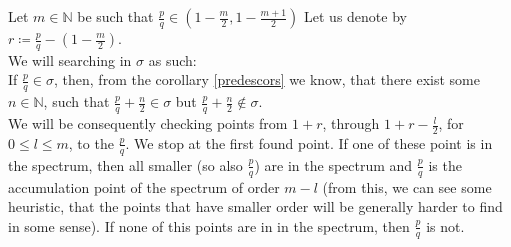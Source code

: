 
Let $m \in \mathbb{N}$ be such that $\frac{p}{q} \in (1-\frac{m}{2},1-
\frac{m+1}{2})$
Let us denote by $r \coloneqq \frac{p}{q} - (1-\frac{m}{2})$. \\ 

We will searching in $\sigma$ as such: \\

If $\frac{p}{q} \in \sigma$, then, from the corollary \ref{predescors} we know, that there 
exist some $n \in \mathbb{N}$, such that $\frac{p}{q} + \frac{n}{2} \in \sigma$ but 
$\frac{p}{q} + \frac{n}{2} \not\in \sigma$. \\

We will be consequently checking points from $1+r$, through $1+r-\frac{l}{2}$, for 
$0 \leq l \leq m$, to the $\frac{p}{q}$. We stop at the first found point. 
If one of these point is in the spectrum, then all smaller (so also $\frac{p}{q}$) are in 
the spectrum and $\frac{p}{q}$ is the accumulation point of the spectrum of order $m-l$ 
(from this, 
 we can see some heuristic, that the points that have smaller order will be generally 
harder to find in some sense). If none of this points are in in the spectrum, then $\frac{p}{q}$ 
is not.






